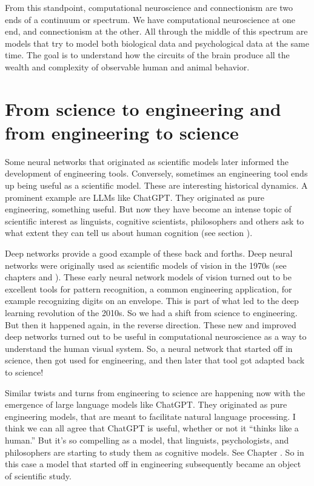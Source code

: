  From this standpoint, computational neuroscience and connectionism are two ends of a continuum or spectrum. We have computational neuroscience at one end, and connectionism at the other. All through the middle of this spectrum are models that try to model both biological data and psychological data at the same time. The goal is to understand how the circuits of the brain produce all the wealth and complexity of observable human and animal behavior. 

\section{From science to engineering and from engineering to science}

Some neural networks that originated as scientific models later informed the development of engineering tools. Conversely, sometimes an engineering tool ends up being useful as a scientific model. These are interesting historical dynamics. A prominent example are LLMs like ChatGPT. They originated as pure engineering, something useful. But now they have become an intense topic of scientific interest as linguists, cognitive scientists, philosophers and others ask to what extent they can tell us about human cognition (see section ).
 
 Deep networks provide a good example of these back and forths. Deep neural networks  were originally used as scientific models of vision in the 1970s (see chapters  and  ).  These early neural network models of vision turned out to be excellent tools for pattern recognition, a common engineering application, for example recognizing digits on an envelope. This is part of what led to the deep learning revolution of the 2010s. So we had a shift from science to engineering. But then it happened again, in the reverse direction. These new and improved deep networks turned out to be useful in computational neuroscience as a way to understand the human visual system. So, a neural network that started off in science, then got used for engineering, and then later that tool got adapted back to science! 

Similar twists and turns from engineering to science are happening now with the emergence of large language models like ChatGPT. They originated as pure engineering models, that are meant to facilitate natural language processing. I think we can all agree that ChatGPT is useful, whether or not it ``thinks like a human.'' But it's so compelling as a model, that linguists, psychologists, and philosophers are starting to study them as cognitive models.  See Chapter . So in this case a model that started off in engineering subsequently became an object of scientific study.

